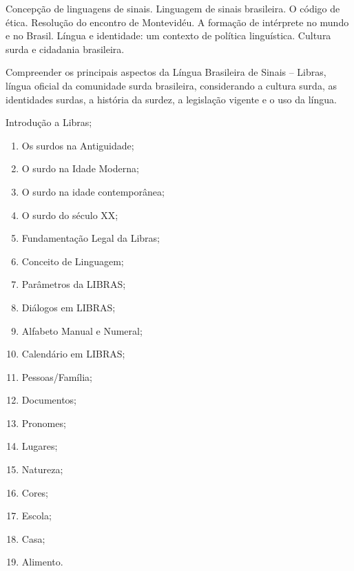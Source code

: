 \begin{pud}
	
	
	\ementa
	Concepção de linguagens de sinais. Linguagem de sinais brasileira. O código de ética. Resolução do encontro de Montevidéu. A formação de intérprete no mundo e no Brasil. Língua e identidade: um contexto de política linguística. Cultura surda e cidadania brasileira.
	
	\objetivos
	Compreender os principais aspectos da Língua Brasileira de Sinais -- Libras, língua oficial da comunidade surda brasileira, considerando a cultura surda, as identidades surdas, a história da surdez, a legislação vigente e o uso da língua.
	
	\programa
	\begin{description}[itemsep=0em]
		\item[UNIDADE I:] Introdução a Libras; 
	         \begin{enumerate}[itemsep=0em, topsep=0em]
				\item  Os surdos na Antiguidade;
				\item  O surdo na Idade Moderna;
				\item  O surdo na idade contemporânea;
				\item  O surdo do século XX;
				\item  Fundamentação Legal da Libras;
				\item  Conceito de Linguagem;
				\item  Parâmetros da LIBRAS;
				\item  Diálogos em LIBRAS;
				\item  Alfabeto Manual e Numeral;
				\item  Calendário em LIBRAS;
				\item  Pessoas/Família;
				\item  Documentos;
				\item  Pronomes; 
				\item Lugares;
				\item Natureza; 
				\item Cores; 
				\item Escola; 
				\item Casa; 
				\item Alimento. 
	        \end{enumerate}
	        

\end{description}
\end{pud}
